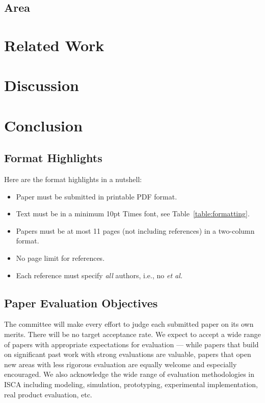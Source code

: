 \documentclass[conference]{IEEEtran}
\begin{document}
\subsection{Area}



\section{Related Work}

\section{Discussion}


\section{Conclusion}

\subsection{Format Highlights}

Here are the format highlights in a nutshell:
\begin{itemize}
\item Paper must be submitted in printable PDF format.
\item Text must be in a minimum 10pt Times font, see Table~\ref{table:formatting}.
\item Papers must be at most 11 pages (not including references) in a
  two-column format.
\item No page limit for references.
\item Each reference must specify {\em all} authors, i.e., no {\em et al.}
\end{itemize}

\subsection{Paper Evaluation Objectives}
The committee will make every effort to judge each submitted paper on
its own merits. There will be no target acceptance rate. We expect to
accept a wide range of papers with appropriate expectations for
evaluation --- while papers that build on significant past work with
strong evaluations are valuable, papers that open new areas with less
rigorous evaluation are equally welcome and especially encouraged. We
also acknowledge the wide range of evaluation methodologies in ISCA including
modeling, simulation, prototyping, experimental implementation, real
product evaluation, etc.
\end{document}
